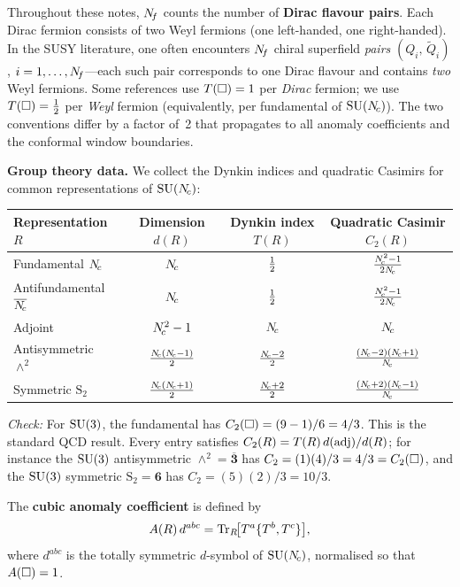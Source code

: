 \documentclass[11pt,a4paper]{article}
\begin{document}
\begin{warningbox}[title={Weyl vs.\ Dirac counting}]
  Throughout these notes, $N_{\!f}$ counts the number of \textbf{Dirac flavour
  pairs}.  Each Dirac fermion consists of two Weyl fermions (one
  left-handed, one right-handed).  In the SUSY literature, one often
  encounters $N_{\!f}$ chiral superfield \emph{pairs} $(Q_i,\,\widetilde{Q}_i)$,
  $i = 1,\ldots,N_{\!f}$---each such pair corresponds to one Dirac flavour and
  contains \emph{two} Weyl fermions.  Some references use $T(\square) = 1$
  per \emph{Dirac} fermion; we use $T(\square) = \tfrac{1}{2}$ per \emph{Weyl}
  fermion (equivalently, per fundamental of $\mathrm{SU}(N_{\!c})$).  The two
  conventions differ by a factor of~2 that propagates to all anomaly
  coefficients and the conformal window boundaries.
\end{warningbox}

\textbf{Group theory data.}  We collect the Dynkin indices and quadratic
Casimirs for common representations of $\mathrm{SU}(N_{\!c})$:

\begin{center}
\renewcommand{\arraystretch}{1.3}
\begin{tabular}{@{}l c c c@{}}
\toprule
\textbf{Representation} $R$ & \textbf{Dimension} $d(R)$
  & \textbf{Dynkin index} $T(R)$ & \textbf{Quadratic Casimir} $C_2(R)$ \\
\midrule
Fundamental $N_{\!c}$ & $N_{\!c}$ & $\tfrac{1}{2}$ & $\frac{N_{\!c}^2 - 1}{2N_{\!c}}$ \\[3pt]
Antifundamental $\overline{N_{\!c}}$ & $N_{\!c}$ & $\tfrac{1}{2}$ & $\frac{N_{\!c}^2 - 1}{2N_{\!c}}$ \\[3pt]
Adjoint & $N_{\!c}^2 - 1$ & $N_{\!c}$ & $N_{\!c}$ \\[3pt]
Antisymmetric $\wedge^2$ & $\frac{N_{\!c}(N_{\!c}-1)}{2}$ & $\frac{N_{\!c}-2}{2}$
  & $\frac{(N_{\!c}-2)(N_{\!c}+1)}{N_{\!c}}$ \\[3pt]
Symmetric $\mathrm{S}_2$ & $\frac{N_{\!c}(N_{\!c}+1)}{2}$ & $\frac{N_{\!c}+2}{2}$
  & $\frac{(N_{\!c}+2)(N_{\!c}-1)}{N_{\!c}}$ \\[3pt]
\bottomrule
\end{tabular}
\end{center}

\noindent\textit{Check:} For $\mathrm{SU}(3)$, the fundamental has
$C_2(\square) = (9-1)/6 = 4/3$.  This is the standard QCD result.
Every entry satisfies $C_2(R) = T(R)\,d(\mathrm{adj})/d(R)$; for instance the
$\mathrm{SU}(3)$ antisymmetric $\wedge^2 = \overline{\mathbf{3}}$ has
$C_2 = (1)(4)/3 = 4/3 = C_2(\square)$, and the $\mathrm{SU}(3)$ symmetric
$\mathrm{S}_2 = \mathbf{6}$ has $C_2 = (5)(2)/3 = 10/3$.

The \textbf{cubic anomaly coefficient} is defined by
\begin{equation}
  A(R)\, d^{abc} = \mathrm{Tr}_R\!\bigl[T^a \{T^b, T^c\}\bigr],
  \label{eq:anomaly-coeff-def}
\end{equation}
where $d^{abc}$ is the totally symmetric $d$-symbol of $\mathrm{SU}(N_{\!c})$,
normalised so that $A(\square) = 1$.
\end{document}
